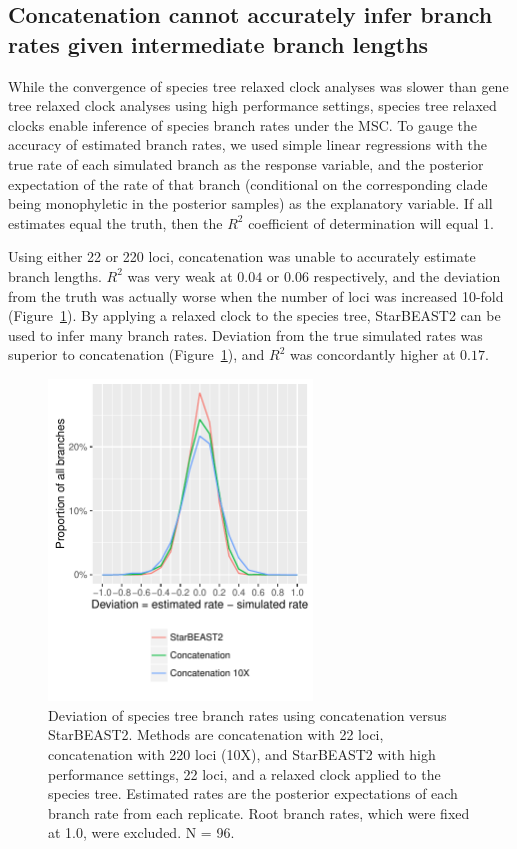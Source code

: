 \documentclass[nogrid]{MBE}%
\begin{document}
\clearpage

\subsection{Concatenation cannot accurately infer branch rates given intermediate branch lengths}

While the convergence of species tree relaxed clock analyses was slower than
gene tree relaxed clock analyses using high performance settings, species tree relaxed
clocks enable inference of species branch rates under the MSC. To gauge the
accuracy of estimated branch rates, we used simple linear regressions with the
true rate of each simulated branch as the response variable, and the posterior
expectation of the rate of that branch (conditional on the corresponding clade
being monophyletic in the posterior samples) as the explanatory variable. If all
estimates equal the truth, then the $R^2$ coefficient of determination will
equal 1.

Using either 22 or 220 loci, concatenation was unable to accurately estimate
branch lengths. $R^2$ was very weak at $0.04$ or $0.06$ respectively, and the
deviation from the truth was actually worse when the number of loci was
increased 10-fold (Figure~\ref{fig:deviation}). By applying a relaxed clock to
the species tree, StarBEAST2 can be used to infer many branch rates. Deviation
from the true simulated rates was superior to concatenation
(Figure~\ref{fig:deviation}), and $R^2$ was concordantly higher at $0.17$.

\begin{figure}[htb!]
\centering
\includegraphics[width=7cm]{branch_rate_deviation.pdf}
\caption
{Deviation of species tree branch rates using concatenation versus StarBEAST2.
Methods are concatenation with 22 loci, concatenation with 220 loci (10X), and
StarBEAST2 with high performance settings, 22 loci, and a relaxed clock applied
to the species tree. Estimated rates are the posterior expectations of each
branch rate from each replicate. Root branch rates, which were fixed at 1.0,
were excluded. N = 96.}
\label{fig:deviation}
\end{figure}
\end{document}
